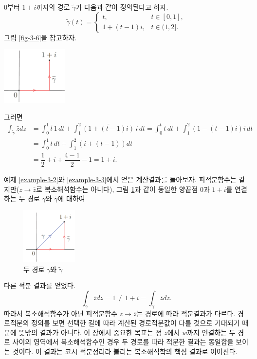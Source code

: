 \begin{saltexample}[label=example-3-3]{}{} %
$0$부터 $1+i$까지의 경로 $\tilde\gamma$가 다음과 같이 정의된다고 하자.
\[
\tilde\gamma(t) = \begin{cases}
t, & t\in[0,1], \\
1+(t-1)i, & t\in (1,2].
\end{cases}
\]
그림 \ref{fig-3-6}을 참고하자.
\begin{center}
\includegraphics[width=0.25\textwidth]{./SaltChapter/figs/fig-3-6}
\end{center}
\label{fig-3-6}
\saltfigskip
그러면
\begin{align*}
\int_{\tilde\gamma} \bar z dz 
&= \int_0^1 \bar t \,1\,dt
+ \int_1^2 \overline{(1+(t-1)i)}\,i\, dt
= \int_0^t t\,dt + \int_1^2 (1-(t-1)i)i\,dt \\
&= \int_0^1 t\,dt + \int_1^2 (i+(t-1))dt \\
&= \dfrac12 + i + \dfrac{4-1}2 - 1 = 1+ i.
\end{align*}
\end{saltexample}

예제 \ref{example-3-2}와 \ref{example-3-3}에서 얻은 계산결과를 돌아보자.
피적분함수는 같지만($z\to\bar z$로 복소해석함수는 아니다),
그림 \ref{fig-3-7}과 같이
동일한 양끝점 $0$과 $1+i$를 연결하는 두 경로 $\gamma$와 $\tilde\gamma$에 대하여
\begin{figure}[!h]
\begin{center}
\includegraphics[width=0.25\textwidth]{./SaltChapter/figs/fig-3-7}
\end{center}
\caption{두 경로 $\gamma$와 $\tilde\gamma$}
\label{fig-3-7}
\end{figure}
다른 적분 결과를 얻었다.
\[
\int_\gamma \bar z dz = 1 \ne 1+i = \int_{\tilde\gamma}\bar z dz.
\]
따라서 복소해석함수가 아닌 피적분함수 $z\to\bar z$는 경로에 따라 적분결과가 다르다.
경로적분의 정의를 보면
선택한 길에 따라 계산된 경로적분값이 다를 것으로 기대되기 때문에
뜻밖의 결과가 아니다.
이 장에서 중요한 목표는 
점 $z$에서 $w$까지 연결하는 두 경로 사이의 영역에서 복소해석함수인 경우
두 경로를 따라 적분한 결과는 동일함을 보이는 것이다.
이 결과는 코시 적분정리라 불리는 복소해석학의 핵심 결과로 이어진다.


